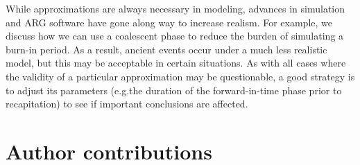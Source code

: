\documentclass[12pt]{article}
\newcommand*{\eg}{e.g.\xcomma}
\begin{document}
While approximations are always necessary in modeling, advances in simulation and ARG software have gone along way to increase realism.
For example, we discuss how we
can use a coalescent phase to reduce the burden of simulating a burn-in period.
As a result, ancient events occur under a much less realistic model, but this may be acceptable in certain situations.
As with all cases where the validity of a particular approximation may be questionable, a good strategy is to adjust its parameters
(\eg the duration of the forward-in-time phase prior to recapitation) to see if important conclusions are affected.





\section*{Author contributions}





\newpage
\appendix
\end{document}
